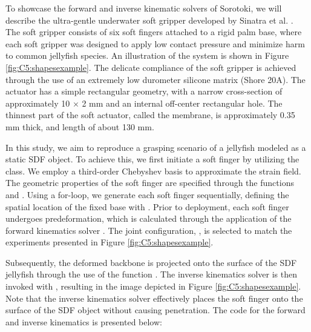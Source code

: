 \vspace{-2mm}
\begin{example}
To showcase the forward and inverse kinematic solvers of Sorotoki, we will describe the ultra-gentle underwater soft gripper developed by Sinatra et al. \cite{Sinatra2019Aug}. The soft gripper consists of six soft fingers attached to a rigid palm base, where each soft gripper was designed to apply low contact pressure and minimize harm to common jellyfish species. An illustration of the system is shown in Figure \ref{fig:C5:shapesexample}. The delicate compliance of the soft gripper is achieved through the use of an extremely low durometer silicone matrix (Shore 20A). The actuator has a simple rectangular geometry, with a narrow cross-section of approximately 10 $\times$ 2 \si{\milli \meter} and an internal off-center rectangular hole. The thinnest part of the soft actuator, called the membrane, is approximately 0.35 \si{\milli \meter} thick, and length of about 130 \si{\milli \meter}.

In this study, we aim to reproduce a grasping scenario of a jellyfish modeled as a static SDF object. To achieve this, we first initiate a soft finger by utilizing the  class. We employ a third-order Chebyshev basis to approximate the strain field. The geometric properties of the soft finger are specified through the functions  and . Using a for-loop, we generate each soft finger sequentially, defining the spatial location of the fixed base with . Prior to deployment, each soft finger undergoes predeformation, which is calculated through the application of the forward kinematics solver . The joint configuration, , is selected to match the experiments presented in Figure \ref{fig:C5:shapesexample}.

Subsequently, the deformed backbone is projected onto the surface of the SDF jellyfish through the use of the function . The inverse kinematics solver is then invoked with , resulting in the image depicted in Figure \ref{fig:C5:shapesexample}. Note that the inverse kinematics solver effectively places the soft finger onto the surface of the SDF object without causing penetration. The code for the forward and inverse kinematics is presented below:
\end{example}

